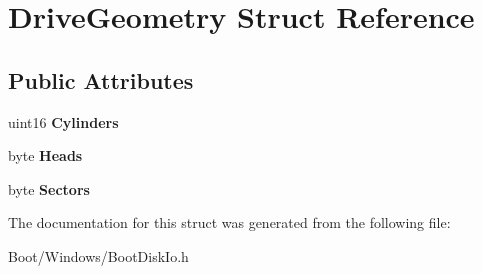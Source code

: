 \hypertarget{struct_drive_geometry}{}\section{Drive\+Geometry Struct Reference}
\label{struct_drive_geometry}
\subsection*{Public Attributes}
\begin{DoxyCompactItemize}
\item 
\mbox{\label{struct_drive_geometry_a36bf96a6b6c9802c65f3f2f2c2b63540}} 
uint16 {\bfseries Cylinders}
\item 
\mbox{\label{struct_drive_geometry_a6ca2e7a7e9aabd8c335813fc22bdca2d}} 
byte {\bfseries Heads}
\item 
\mbox{\label{struct_drive_geometry_a55b675f44885f307809da4817be8edbd}} 
byte {\bfseries Sectors}
\end{DoxyCompactItemize}


The documentation for this struct was generated from the following file\+:\begin{DoxyCompactItemize}
\item 
Boot/\+Windows/Boot\+Disk\+Io.\+h\end{DoxyCompactItemize}
